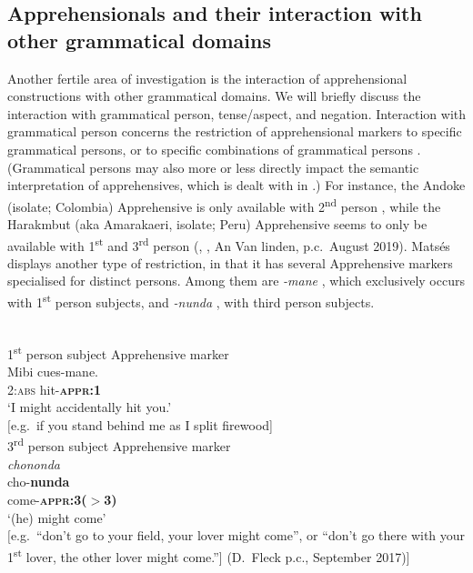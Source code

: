 \documentclass[output=paper,colorlinks,citecolor=brown
]{langscibook}
\begin{document}
\subsection{Apprehensionals and their interaction with other grammatical domains}
\label{subsec:othergramm}

Another fertile area of investigation is the interaction of apprehensional constructions with other grammatical domains. We will briefly discuss the interaction with grammatical person, tense/aspect, and negation. Interaction with grammatical person concerns the restriction of apprehensional markers to specific grammatical persons, or to specific combinations of grammatical persons \citep{vuillermet2018b}. (Grammatical persons may also more or less directly impact the semantic interpretation of  apprehensives, which is dealt with in .) For instance, the Andoke (isolate; Colombia) Apprehensive is only available with 2\textsuperscript{nd} person \citep[89]{landaburu1979}, while the Harakmbut (aka Amarakaeri, isolate; Peru) Apprehensive seems to only be available with 1\textsuperscript{st} and 3\textsuperscript{rd} person (\cite[240]{helbergchavez1989}, \cite[222]{tripp1995}, An Van linden, p.c.\  August 2019). Matsés displays another type of restriction, in that it has several Apprehensive markers specialised for distinct persons. Among them are \textit{-mane} , which exclusively occurs with 1\textsuperscript{st} person subjects, and \textit{-nunda} , with third person subjects.


\ea \label{ex:intro11} 
\\
\ea \label{ex:intro11a} \textnormal{1\textsuperscript{st} person subject Apprehensive marker} \\
\gll Mibi 	cues-mane. \\
2:\textsc{abs} hit-\textsc{\textbf{appr:1}} \\
\glt `I might accidentally hit you.' \\
$[$e.g.\  if you stand behind me as I split firewood] \\
\ex \label{ex:intro11b} \textnormal{3\textsuperscript{rd} person subject Apprehensive marker} \\
\textit{chononda} \\
\gll cho-\textbf{nunda} \\
come-\textsc{\textbf{appr:3($>$3)}} \\
\glt `(he) might come' \\
$[$e.g.\ ``don't go to your field, your lover might come'', or ``don't go there with your 1\textsuperscript{st} lover, the other lover might come.''] (D.\ Fleck p.c., September 2017)]
\z
\z
\end{document}
